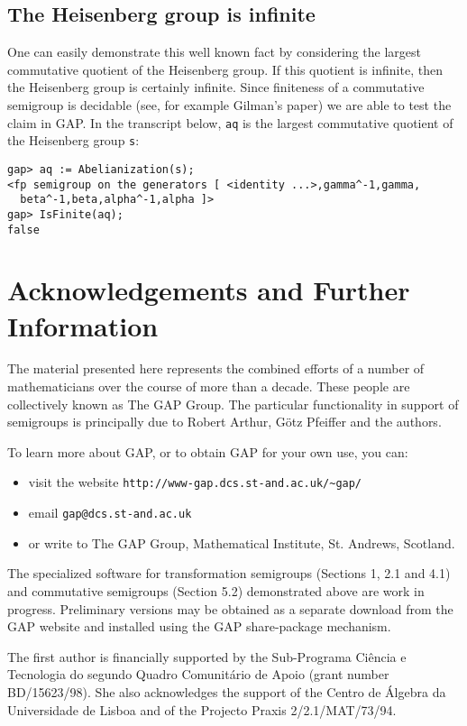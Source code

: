 \documentclass{ws-p8-50x6-00}
\theoremstyle{plain} \newtheorem{Thm}{Theorem}
\theoremstyle{plain} \newtheorem{Cor}{Corollary}
\theoremstyle{plain} \newtheorem{Lemma}{Lemma}
\theoremstyle{plain} \newtheorem{Prop}{Proposition}
\theoremstyle{plain} \newtheorem{Ex}{Exercise}
\def\gap{\sf GAP}
\begin{document}
\subsection{The Heisenberg group is infinite}
One can easily demonstrate this well known fact by considering the 
largest commutative quotient of the Heisenberg group. If this quotient
is infinite, then the Heisenberg group is certainly infinite. 
Since finiteness of a commutative semigroup is decidable (see, for example
Gilman's paper\cite{rhg79}) we are able to test the claim in {\gap}.
In the transcript below, {\tt aq} is the largest commutative 
quotient of the Heisenberg group {\tt s}:
\begin{verbatim}
gap> aq := Abelianization(s);
<fp semigroup on the generators [ <identity ...>,gamma^-1,gamma, 
  beta^-1,beta,alpha^-1,alpha ]>
gap> IsFinite(aq);
false
\end{verbatim}


\section*{Acknowledgements and Further Information}
The material presented here represents the combined efforts of
a number of mathematicians over the course of more than a decade. These
people are collectively known as The {\gap} Group. 
The particular functionality  in support of semigroups is principally due to 
Robert Arthur, G\"{o}tz Pfeiffer and the authors.

To learn more about {\gap}, or to obtain {\gap} for your
own use,  you can:
\begin{itemize}
\item visit the website {\tt http://www-gap.dcs.st-and.ac.uk/\~{}gap/}
\item email  {\tt gap@dcs.st-and.ac.uk}
\item or write to The {\gap} Group, Mathematical Institute, 
St. Andrews, Scotland.
\end{itemize}

The specialized software for transformation semigroups (Sections 1, 2.1
and 4.1) and commutative semigroups (Section 5.2) demonstrated 
above are work in progress.
Preliminary versions may be obtained as a separate download
from the {\gap} website and installed using the {\gap} share-package
mechanism.

The first author is financially supported by the Sub-Programa
Ci\^encia e Tecnologia do segundo Quadro Comunit\'ario de Apoio
(grant number BD/15623/98). She also acknowledges the support
of the Centro de \'Algebra da Universidade de Lisboa and of the Projecto
Praxis 2/2.1/MAT/73/94.
\end{document}
